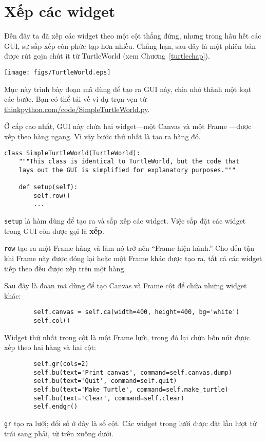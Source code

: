 \documentclass[11pt]{book}
\begin{document}
\section{Xếp các widget}

Đến đây ta đã xếp các widget theo một cột thẳng đứng, nhưng trong hầu hết
các GUI, sự sắp xếp còn phức tạp hơn nhiều. Chẳng hạn, sau đây là một
phiên bản được rút gojn chút ít từ TurtleWorld (xem
Chương~\ref{turtlechap}).

\beforefig
\centerline{
\texttt{[image: figs/TurtleWorld.eps]}
}
\afterfig

Mục này trình bày đoạn mã dùng để tạo ra GUI này, chia nhỏ thành
một loạt các bước. Bạn có thể tải về ví dụ trọn vẹn 
từ \url{thinkpython.com/code/SimpleTurtleWorld.py}.

Ở cấp cao nhất, GUI này chứa hai widget---một Canvas và một Frame
---được xếp theo hàng ngang. Vì vậy bước thứ nhất là tạo ra hàng đó.


\beforeverb
\begin{verbatim}
class SimpleTurtleWorld(TurtleWorld):
    """This class is identical to TurtleWorld, but the code that
    lays out the GUI is simplified for explanatory purposes."""

    def setup(self):
        self.row()
        ...
\end{verbatim}
\afterverb
%
{\tt setup} là hàm dùng để tạo ra và sắp xếp các widget.
Việc sắp đặt các widget trong GUI còn được gọi là {\bf xếp}.


{\tt row} tạo ra một Frame hàng và làm nó trở nên ``Frame hiện hành.''
Cho đến tận khi Frame này được đóng lại hoặc một Frame khác được tạo ra, tất cả
các widget tiếp theo đều được xếp trên một hàng.

Sau đây là đoạn mã dùng để tạo Canvas và Frame cột để 
chứa những widget khác:

\beforeverb
\begin{verbatim}
        self.canvas = self.ca(width=400, height=400, bg='white')
        self.col()
\end{verbatim}
\afterverb
%
Widget thứ nhất trong cột là một Frame lưới, trong đó lại chứa
bốn nút được xếp theo hai hàng và hai cột:

\beforeverb
\begin{verbatim}
        self.gr(cols=2)
        self.bu(text='Print canvas', command=self.canvas.dump)
        self.bu(text='Quit', command=self.quit)
        self.bu(text='Make Turtle', command=self.make_turtle)
        self.bu(text='Clear', command=self.clear)
        self.endgr()
\end{verbatim}
\afterverb
%
{\tt gr} tạo ra lưới; đối số ở đây là số cột.
Các widget trong lưới
được đặt lần lượt từ trái sang phải, từ trên xuống dưới.
\end{document}
